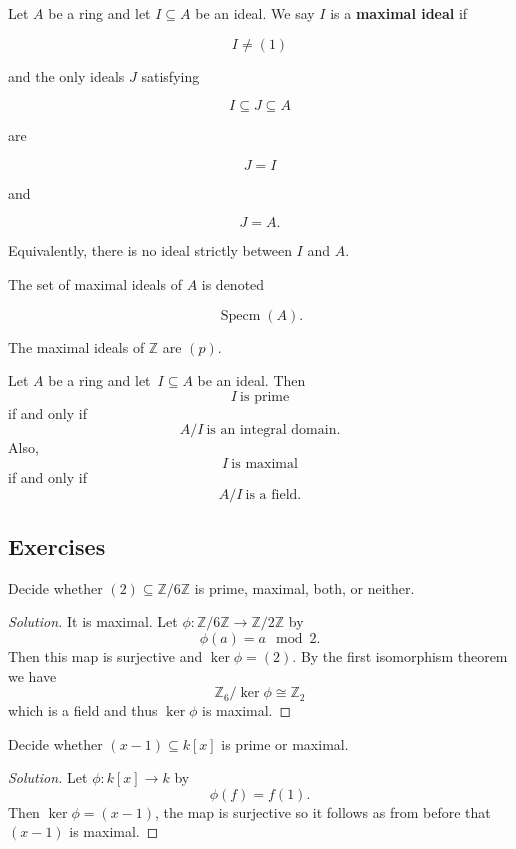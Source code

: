 \begin{defn}
    Let $A$ be a ring and let $I\subseteq A$ be an ideal. 
    We say $I$ is a \textbf{maximal ideal} if

    $$I\neq(1)$$

    and the only ideals $J$ satisfying

    $$I\subseteq J\subseteq A$$

    are

    $$J=I$$

    and

    $$J=A.$$

    Equivalently, there is no ideal strictly between $I$ and $A$.

    The set of maximal ideals of $A$ is denoted

    $$\operatorname{Specm}(A).$$
\end{defn}
\begin{ex}
    The maximal ideals of $\mathbb Z$ are $(p)$. 
\end{ex} 

\begin{thm}
    Let $A$ be a ring and let $I \subseteq A$ be an ideal. 
    Then 
    \[
        I \ \text{is prime}
    \]
    if and only if 
    \[
        A/I \ \text{is an integral domain}.
    \]
    Also, 
    \[
        I \ \text{is maximal}
    \]
    if and only if 
    \[
        A/I \ \text{is a field}. 
    \]
\end{thm}

\subsection*{Exercises}

\begin{prob}
    Decide whether $(2) \subseteq \mathbb Z/6\mathbb Z$ 
    is prime, maximal, both, or neither. 
\end{prob}
\begin{proof}[Solution]
    It is maximal. 
    Let $\phi : \mathbb Z/6\mathbb Z \to \mathbb Z/2\mathbb Z$ 
    by 
    \[
        \phi(a) = a \mod 2. 
    \]
    Then this map is surjective and 
    $\ker \phi = (2)$. By the first isomorphism theorem we 
    have 
    \[
        \mathbb Z_6/\ker \phi \cong \mathbb Z_2
    \]
    which is a field and thus $\ker \phi$ is maximal.  
\end{proof}

\begin{prob}
    Decide whether $(x-1) \subseteq k[x]$ is prime or maximal. 
\end{prob}
\begin{proof}[Solution]
    Let $\phi : k[x] \to k$ by 
    \[
        \phi(f) = f(1). 
    \]
    Then $\ker \phi = (x-1)$, the map is surjective so 
    it follows as from before that $(x-1)$ is maximal. 
\end{proof}

